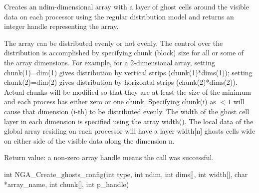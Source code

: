 \documentclass[12pt]{article}
\begin{document}
\begin{desc}

Creates an ndim-dimensional array with a layer of ghost cells around the
visible data on each processor using the regular distribution model and returns
an integer handle representing the array.

The array can be distributed evenly or not evenly. The control over the
distribution is accomplished by specifying chunk (block) size for all or some
of the array dimensions. For example, for a 2-dimensional array, setting
chunk(1)=dim(1) gives distribution by vertical strips (chunk(1)*dims(1));
setting chunk(2)=dim(2) gives distribution by horizontal strips
(chunk(2)*dims(2)). Actual chunks will be modified so that they are at least
the size of the minimum and each process has either zero or one chunk.
Specifying chunk(i) as $< 1$ will cause that dimension (i-th) to be distributed
evenly. The width of the ghost cell layer in each dimension is specified using
the array width(). The local data of the global array residing on each
processor will have a layer width[n] ghosts cells wide on either side of the
visible data along the dimension n.

Return value: a non-zero array handle means the call was successful.

\end{desc}



\begin{capi}
\begin{ccode}
int NGA_Create_ghosts_config(int type, int ndim, int dims[],
                             int width[], char *array_name, int chunk[],
                             int p_handle)
\end{ccode}
\begin{funcargs}
\end{funcargs}
\end{capi}
\end{document}
